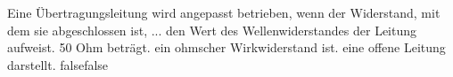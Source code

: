     {Eine Übertragungsleitung wird angepasst betrieben, wenn der Widerstand, mit dem sie abgeschlossen ist, ...}
    {den Wert des Wellenwiderstandes der Leitung aufweist.}
    {50 Ohm beträgt.}
    {ein ohmscher Wirkwiderstand ist.}
    {eine offene Leitung darstellt.}
    {false}{false}